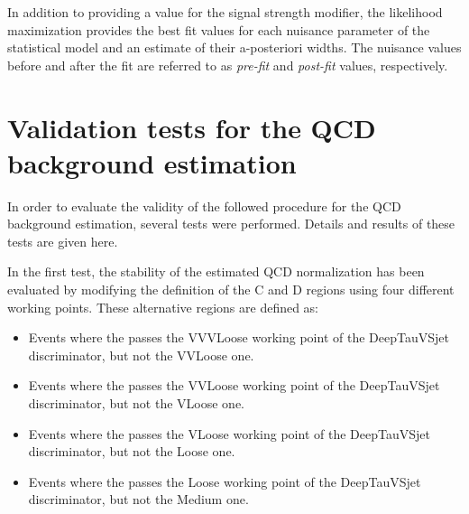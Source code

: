 \documentclass[../main.tex]{subfiles}
\begin{document}
In addition to providing a value for the signal strength modifier, the likelihood maximization provides the best fit values for each nuisance parameter of the statistical model and an estimate of their a-posteriori widths. The nuisance values before and after the fit are referred to as \textit{pre-fit} and \textit{post-fit} values, respectively. %




\section{Validation tests for the QCD background estimation}
\label{hh:sec:validation_qcd}


In order to evaluate the validity of the followed procedure for the QCD background estimation, several tests were performed. Details and results of these tests are given here.

In the first test, the stability of the estimated QCD normalization has been evaluated by modifying the definition of the C and D regions using four different \deeptau{} working points. These alternative regions are defined as:
\begin{itemize}
\item Events where the \tauh{} passes the VVVLoose working point of the DeepTauVSjet discriminator, but not the VVLoose one.
\item Events where the \tauh{} passes the VVLoose working point of the DeepTauVSjet discriminator, but not the VLoose one.
\item Events where the \tauh{} passes the VLoose working point of the DeepTauVSjet discriminator, but not the Loose one.
\item Events where the \tauh{} passes the Loose working point of the DeepTauVSjet discriminator, but not the Medium one.
\end{itemize}
\end{document}
